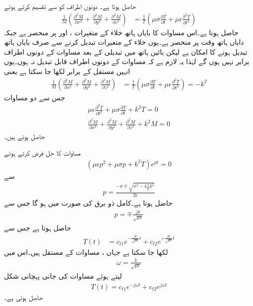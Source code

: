 حاصل ہوتا ہے۔ دونوں اطراف کو  سے تقسیم کرتے ہوئے
\begin{align*}
\frac{1}{M}\left(\frac{\partial^2 M}{\partial x^2}+\frac{\partial^2 M}{\partial y^2}+\frac{\partial^2 M}{\partial z^2}\right)&=\frac{1}{T}\left(\mu \sigma \frac{\partial T}{\partial t}+\mu\epsilon \frac{\partial^2 T}{\partial t^2}\right)
\end{align*}
حاصل ہوتا ہے۔اس مساوات کا بایاں ہاتھ خلاء کے متغیرات ،  اور  پر منحصر ہے جبکہ دایاں ہاتھ وقت  پر منحصر ہے۔یوں خلاء کے متغیرات تبدیل کرنے سے صرف بایاں ہاتھ تبدیل ہونے کا امکان ہے لیکن بائیں ہاتھ میں تبدیلی کے بعد مساوات کے دونوں اطراف برابر نہیں ہوں گے لہٰذا یہ لازم ہے کہ مساوات کے دونوں اطراف قابل تبدیل نہ ہوں۔یوں انہیں مستقل  کے برابر لکھا جا سکتا ہے یعنی
\begin{align*}
\frac{1}{M}\left(\frac{\partial^2 M}{\partial x^2}+\frac{\partial^2 M}{\partial y^2}+\frac{\partial^2 M}{\partial z^2}\right)&=\frac{1}{T}\left(\mu \sigma \frac{\partial T}{\partial t}+\mu\epsilon \frac{\partial^2 T}{\partial t^2}\right)=-k^2
\end{align*}
جس سے دو مساوات 
\begin{align}
\mu\epsilon \frac{\partial^2 T}{\partial t^2}+\mu \sigma \frac{\partial T}{\partial t}+k^2 T=0\label{مساوات_مویج_مستطیلی_گھمکیا_ج}\\
\frac{\partial^2 M}{\partial x^2}+\frac{\partial^2 M}{\partial y^2}+\frac{\partial^2 M}{\partial z^2}+k^2 M=0\label{مساوات_مویج_مستطیلی_گھمکیا_چ}
\end{align}
حاصل ہوتے ہیں۔

مساوات  کا حل  فرض کرتے ہوئے
\begin{align*}
\left(\mu\epsilon p^2+\mu \sigma p+k^2 T\right)e^{pt}=0
\end{align*}
سے
\begin{align*}
p=\frac{-\sigma\mp \sqrt{\sigma^2-4\frac{\epsilon}{\mu}k^2}}{2\epsilon}
\end{align*}
حاصل ہوتا ہے۔کامل ذو برق کی صورت میں  ہو گا جس سے
\begin{align}
p=\mp \frac{j k}{\sqrt{\mu \epsilon}} 
\end{align}
حاصل ہوتا ہے جس سے
\begin{align*}
T(t)&=c_{t1} e^{-\frac{j k}{\sqrt{\mu \epsilon}} t}+c_{t2} e^{+\frac{j k}{\sqrt{\mu \epsilon}} t}
\end{align*}
لکھا جا سکتا ہے  جہاں ،  مساوات کے مستقل ہیں۔اس میں
\begin{align}\label{مساوات_مویج_میکس_ویل_عمومی_تعدد}
\omega=\frac{ k}{\sqrt{\mu \epsilon}}
\end{align}
لیتے ہوئے مساوات کی جانی پہچانی شکل
\begin{align}
T(t)=c_{t1} e^{- j\omega t}+c_{t2} e^{ j\omega t}
\end{align}
حاصل ہوتی ہے۔

